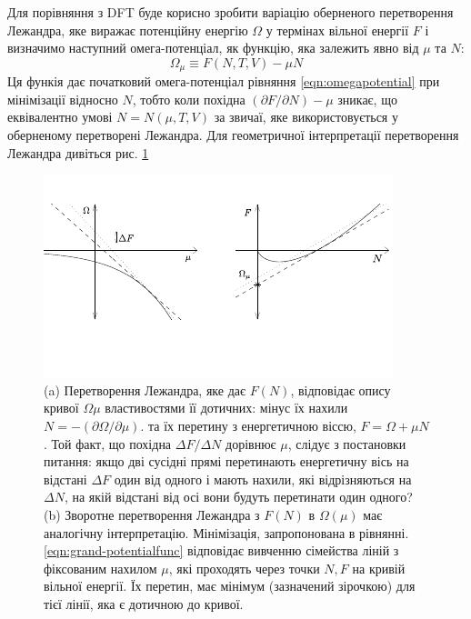 Для порівняння з DFT буде корисно зробити варіацію оберненого перетворення Лежандра, яке виражає потенційну енергію $\Omega$ у термінах вільної енергії $F$ і визначимо наступний омега-потенціал, як функцію, яка залежить явно від $\mu$ та $N$:
\begin{equation}
	\label{eqn:grand-potentialfunc}
	\Omega_\mu \equiv F(N,T,V) - {\mu} N
\end{equation}
Ця функія дає початковий омега-потенціал рівняння \ref{eqn:omegapotential} при мінімізації відносно $N$, тобто коли похідна $(\partial{F}/\partial{N}) - \mu$ зникає, що еквівалентно умові $N = N(\mu,T,V)$ за звичаї, яке використовується у оберненому перетворені Лежандра. Для геометричної інтерпретації перетворення Лежандра дивіться рис. \ref{fig:legander_transform}
\begin{figure}[H]
  \centering
  \includegraphics[scale=2.5]{img/Legender_transform.pdf}
  \caption{(a) Перетворення Лежандра, яке дає $F(N)$, відповідає опису кривої $\Omega\mu$ властивостями її дотичних: мінус їх нахили $N = -(\partial{\Omega}/\partial{\mu})$. та їх перетину з енергетичною віссю, $F = \Omega + \mu N$. Той факт, що похідна $\Delta F / \Delta N$ дорівнює $\mu$, слідує з постановки питання: якщо дві сусідні прямі перетинають енергетичну вісь на відстані $\Delta F$ один від одного і мають нахили, які відрізняються на $\Delta N$, на якій відстані від осі вони будуть перетинати один одного? (b) Зворотне перетворення Лежандра з $F(N)$ в $\Omega (\mu)$ має аналогічну інтерпретацію. Мінімізація, запропонована в рівнянні. \ref{eqn:grand-potentialfunc} відповідає вивченню сімейства ліній з фіксованим нахилом $\mu$, які проходять через точки $N, F$ на кривій вільної енергії. Їх перетин, має мінімум (зазначений зірочкою) для тієї лінії, яка є дотичною до кривої.}
  \label{fig:legander_transform}
\end{figure}
